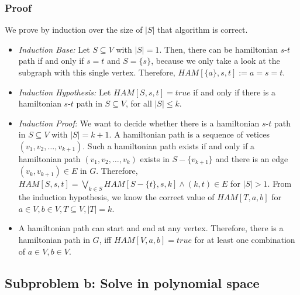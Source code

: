 \documentclass[12pt]{article}
\begin{document}
\subsubsection*{Proof}
We prove by induction over the size of $|S|$ that algorithm is correct.

\begin{itemize}
	\item \emph{Induction Base:} Let $S \subseteq V$ with $|S| = 1$. Then, there can be hamiltonian $s$-$t$ path if and only if $s=t$ and $S=\{s\}$, because we only take a look at the subgraph with this single vertex. Therefore, $\mathit{HAM}[\{a\}, s, t] := a = s = t$.
	\item \emph{Induction Hypothesis:} Let $\mathit{HAM}[S, s, t] = \mathit{true}$ if and only if there is a hamiltonian $s$-$t$ path in $S \subseteq V$, for all $|S| \leq k$.
	\item \emph{Induction Proof:} We want to decide whether there is a hamiltonian $s$-$t$ path in $S \subseteq V$ with $|S|=k+1$. A hamiltonian path is a sequence of vetices $(v_1, v_2, \ldots, v_{k+1})$. Such a hamiltonian path exists if and only if a hamiltonian path $(v_1, v_2, \ldots, v_k)$ exists in $S - \{v_{k+1}\}$ and there is an edge $(v_k, v_{k+1}) \in E$ in $G$. Therefore, $\mathit{HAM}[S, s, t] = \bigvee_{k \in S} \mathit{HAM}[S - \{t\}, s, k] \wedge (k, t) \in E$ for $|S| > 1$. From the induction hypothesis, we know the correct value of $\mathit{HAM}[T, a, b]$ for $a \in V, b \in V, T \subseteq V, |T| = k$.
	\item A hamiltonian path can start and end at any vertex. Therefore, there is a hamiltonian path in $G$, iff $\mathit{HAM}[V, a, b] = \mathit{true}$ for at least one combination of $a \in V, b \in V$.
\end{itemize}

\subsection*{Subproblem b: Solve in polynomial space}
\end{document}
